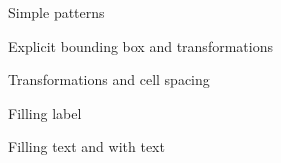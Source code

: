 

Simple patterns
\bigskip

Explicit bounding box and transformations
\bigskip

Transformations and cell spacing
\bigskip

Filling label
\bigskip

Filling text and with text

\bye
